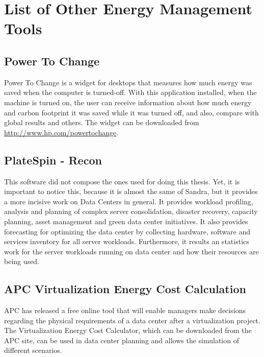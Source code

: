 

\chapter{List of Other Energy Management Tools} \label{app:list_other_energy_management_tools}
    \section{Power To Change} \label{app:power_to_change}
    Power To Change is a widget for desktops that measures how much energy was saved when the computer is turned-off. With this application installed, when the machine is turned on, the user can receive information about how much energy and carbon footprint it was saved while it was turned off, and also, compare with global results and others.
    The widget can be downloaded from \url{http://www.hp.com/powertochange}.

    \section{PlateSpin - Recon} \label{app:power_recon}
    This software did not compose the ones used for doing this thesis. Yet, it is important to notice this, because it is almost the same of Sandra, but it provides a more incisive work on Data Centers in general. It provides workload profiling, analysis and planning of complex server consolidation, disaster recovery, capacity planning, asset management and green data center initiatives. It also provides forecasting for optimizing the data center by collecting hardware, software and services inventory for all server workloads. Furthermore, it results an statistics work for the server workloads running on data center and how their resources are being used.
    
    \section{APC Virtualization Energy Cost Calculation}\label{app:apc_virtualization_energy_cost_calculation}
        APC has released a free online tool that will enable managers make decisions regarding the physical requirements of a data center after a virtualization project. The Virtualization Energy Cost Calculator, which can be downloaded from the APC site, can be used in data center planning and allows the simulation of different scenarios.

